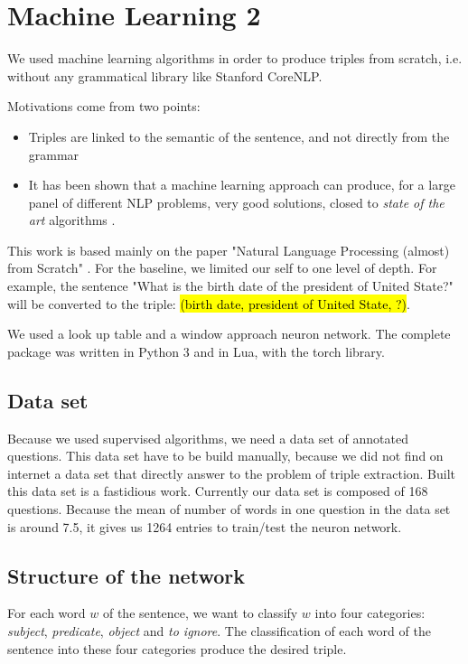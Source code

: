 \section{Machine Learning 2}


We used machine learning algorithms in order to produce triples from scratch, i.e. without any grammatical library like Stanford CoreNLP.

Motivations come from two points:
\begin{itemize}
\item Triples are linked to the semantic of the sentence, and not directly from the grammar
\item It has been shown that a machine learning approach can produce, for a large panel of different NLP problems, very good solutions, closed to \textit{state of the art} algorithms \cite{collobert}.
\end{itemize}

This work is based mainly on the paper "Natural Language Processing (almost) from Scratch" \cite{collobert}.
For the baseline, we limited our self to one level of depth.
For example, the sentence "What is the birth date of the president of United State?" will be converted to the triple: 
\hl{(birth date, president of United State, ?)}. 

We used a look up table and a window approach neuron network. The complete package was written in Python 3 and in Lua, with the torch library.

\subsection{Data set}

Because we used supervised algorithms, we need a data set of annotated questions.
This data set have to be build manually, because we did not find on internet a data set that directly answer to the problem of triple extraction.
Built this data set is a fastidious work. Currently our data set is composed of 168 questions.
Because the mean of number of words in one question in the data set is around 7.5, it gives us 1264 entries to train/test the neuron network.

\subsection{Structure of the network}

For each word $w$ of the sentence, we want to classify $w$ into four categories: \textit{subject}, \textit{predicate}, \textit{object} and \textit{to ignore}.
The classification of each word of the sentence into these four categories produce the desired triple.

